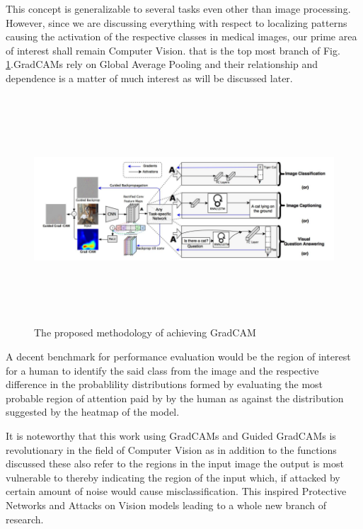 \documentclass[19pt]{article}
\begin{document}
This concept is generalizable to several tasks even other than image processing. However, since we are discussing everything with respect to localizing patterns causing the activation of the respective classes in medical images, our prime area of interest shall remain Computer Vision. that is the top most branch of Fig. \ref{fig:11}.GradCAMs rely on Global Average Pooling and their relationship and dependence is a matter of much interest as will be discussed later.
\newpage
\begin{center}
    \begin{figure}[!h!t!b]
        \centerline{\includegraphics[width=175mm,height=85mm]{images/gradcamnet.png}} 
        \caption{The proposed methodology of achieving GradCAM}
        \label{fig:11}
    \end{figure}
\end{center}

A decent benchmark for performance evaluation would be the region of interest for a human to identify the said class from the image and the respective difference in the probablility distributions formed by evaluating the most probable region of attention paid by by the human as against the distribution suggested by the heatmap of the model.

It is noteworthy that this work using GradCAMs and Guided GradCAMs is revolutionary in the field of Computer Vision as in addition to the functions discussed these also refer to the regions in the input image the output is most vulnerable to thereby indicating the region of the input which, if attacked by certain amount of noise would cause misclassification. This inspired Protective Networks and Attacks on Vision models leading to a whole new branch of research.
\end{document}
